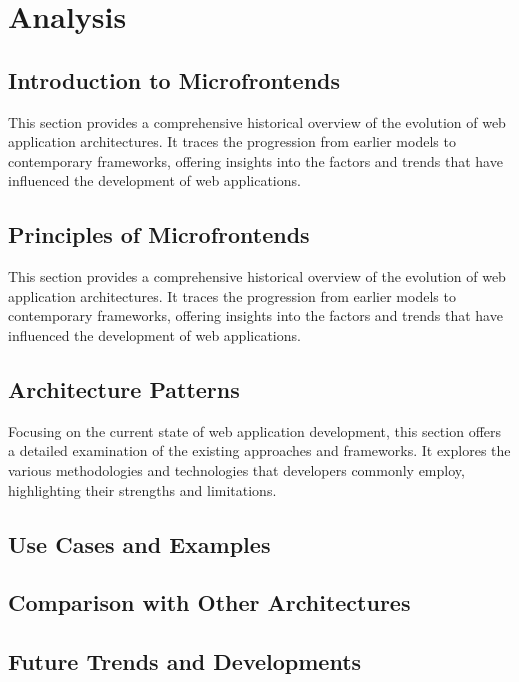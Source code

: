 \chapter{Analysis}
\label{chap:Analysis} 

\section{Introduction to Microfrontends}
This section provides a comprehensive historical overview of the evolution of web application architectures. It traces the progression from earlier models to contemporary frameworks, offering insights into the factors and trends that have influenced the development of web applications.

\section{Principles of Microfrontends}
This section provides a comprehensive historical overview of the evolution of web application architectures. It traces the progression from earlier models to contemporary frameworks, offering insights into the factors and trends that have influenced the development of web applications.

\section{Architecture Patterns}
Focusing on the current state of web application development, this section offers a detailed examination of the existing approaches and frameworks. It explores the various methodologies and technologies that developers commonly employ, highlighting their strengths and limitations.

\section{Use Cases and Examples}

\section{Comparison with Other Architectures}

\section{Future Trends and Developments}

